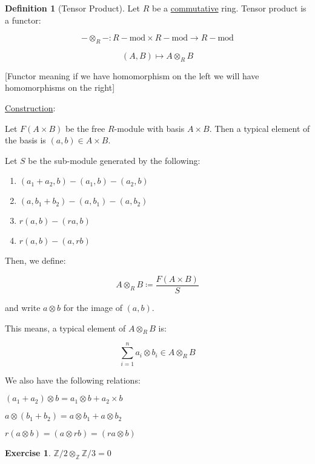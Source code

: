 \documentclass{article}
\theoremstyle{definition}
\newtheorem*{exercise}{Exercise}
\newtheorem*{definition}{Definition}
\begin{document}
\begin{definition}
    [Tensor Product] Let \(R\) be a \underline{commutative} ring. Tensor product is a functor:

    \[
        - \otimes_R - : R-\text{mod} \times R-\text{mod} \to R-\text{mod} 
    \]

    \[
        (A,B) \mapsto A \otimes_R B
    \]

    [Functor meaning if we have homomorphism on the left we will have homomorphisms on the right]

    \underline{Construction}:

    Let \(F(A \times B)\) be the free \(R\)-module with basis \(A \times B\). Then a typical element of the basis is \((a,b)\in A \times B\). 

    Let \(S\) be the sub-module generated by the following:

    \begin{enumerate}[label=\arabic*)]
        \item \((a_1 + a_2, b) - (a_1,b) - (a_2,b)\)
        \item \((a, b_1 + b_2) - (a,b_1) - (a,b_2)\)
        \item \(r(a,b)-(ra,b)\) 
        \item \(r(a,b)-(a,rb)\) 
    \end{enumerate} 

    Then, we define:

    \[
        A \otimes _R B \coloneqq \frac{F(A\times B)}{S}
    \]

    and write \(a \otimes b\) for the image of \((a,b)\). 

    This means, a typical element of \(A \otimes _R B\) is:

    \[
        \sum_{i=1}^n a_i \otimes b_i \in A \otimes _R B 
    \]

    We also have the following relations:

    \((a_1 + a_2) \otimes b = a_1 \otimes b + a_2 \times b\) 

    \(a \otimes (b_1 + b_2) = a \otimes b_1 + a \otimes b_2\) 

    \(r(a \otimes b) = (a \otimes rb) = (ra \otimes b)\) 
\end{definition}

\begin{exercise}
    \(\mathbb{Z} / 2 \otimes _ \mathbb{Z} \mathbb{Z} / 3 = 0\) 
\end{exercise}
\end{document}
